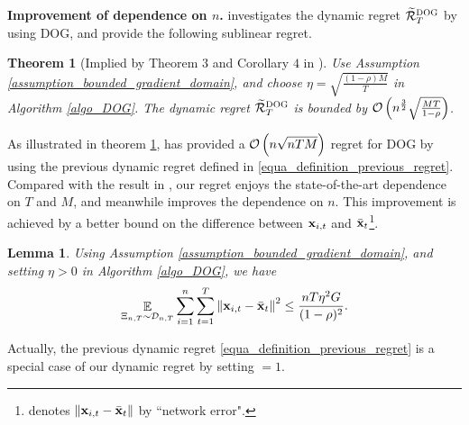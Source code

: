 \documentclass{article}
\newtheorem{Theorem}{\bf{Theorem}}
\newtheorem{Lemma}{\bf{Lemma}}
\begin{document}
\textbf{Improvement of dependence on $n$.}  \citet{8015179Shahram} investigates the dynamic regret $\widetilde{{\mathcal{R}}}_T^{\textsc{DOG}}$ by using DOG, and provide the following sublinear regret.
\begin{Theorem}[Implied by Theorem $3$ and Corollary $4$ in \citet{8015179Shahram}]
\label{theorem_privious_dog_regret}
Use Assumption \ref{assumption_bounded_gradient_domain}, and choose $\eta = \sqrt{\frac{(1-\rho) M}{T}}$ in Algorithm \ref{algo_DOG}. The dynamic regret $\widetilde{{\mathcal{R}}}_T^{\textsc{DOG}}$ is bounded by ${\mathcal{O}\left( n^{\frac{3}{2}}\sqrt{\frac{MT}{1-\rho}}  \right)}$.
\end{Theorem}

As illustrated in theorem \ref{theorem_privious_dog_regret},   \citet{8015179Shahram} has provided a ${\mathcal{O}\left( n\sqrt{nTM} \right)}$ regret for DOG by using the previous dynamic regret defined in \eqref{equa_definition_previous_regret}. Compared with the result in \citet{8015179Shahram}, our regret enjoys the state-of-the-art dependence on $T$ and $M$, and meanwhile improves the dependence on $n$. This improvement is achieved by a better bound on the difference between ${\bf x}_{i,t}$ and $\bar{{\bf x}}_t$\footnote{\citet{8015179Shahram} denotes $\left\lVert{\bf x}_{i,t} - \bar{{\bf x}}_t\right\rVert$ by ``network error".}.
\begin{Lemma}
\label{lemma_x_variance_norm_square}
Using Assumption \ref{assumption_bounded_gradient_domain}, and setting $\eta>0$ in Algorithm \ref{algo_DOG}, we have 
\begin{align}
\nonumber
\mathop{\mathbb{E}}_{ \Xi_{n,T} \sim \mathcal{D}_{n,T} } \sum_{i=1}^n\sum_{t=1}^T \left\lVert{\bf x}_{i,t} - \bar{{\bf x}}_t\right\rVert^2 \le \frac{nT\eta^2 G }{(1-\rho)^2}.
\end{align}
\end{Lemma}
Actually, the previous dynamic regret \eqref{equa_definition_previous_regret} is a special case of our dynamic regret  by setting $  = 1$.
\end{document}
